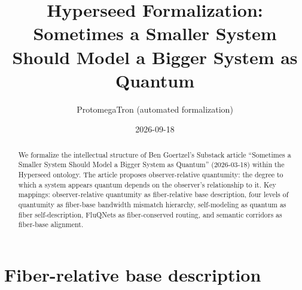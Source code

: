 \documentclass[11pt,a4paper]{article}
\title{Hyperseed Formalization:\\
  Sometimes a Smaller System Should Model a Bigger System as Quantum}
\author{ProtomegaTron (automated formalization)}
\date{2026-09-18}
\begin{document}
\maketitle

\begin{abstract}
We formalize the intellectual structure of Ben Goertzel's Substack article
``Sometimes a Smaller System Should Model a Bigger System as Quantum''
(2026-03-18) within the Hyperseed ontology. The article proposes
observer-relative quantumity: the degree to which a system appears quantum
depends on the observer's relationship to it. Key mappings: observer-relative
quantumity as fiber-relative base description, four levels of quantumity as
fiber-base bandwidth mismatch hierarchy, self-modeling as quantum as fiber
self-description, FluQNets as fiber-conserved routing, and semantic corridors
as fiber-base alignment.
\end{abstract}

\tableofcontents

\section{Fiber-relative base description}
\label{sec:relative}
\end{document}
